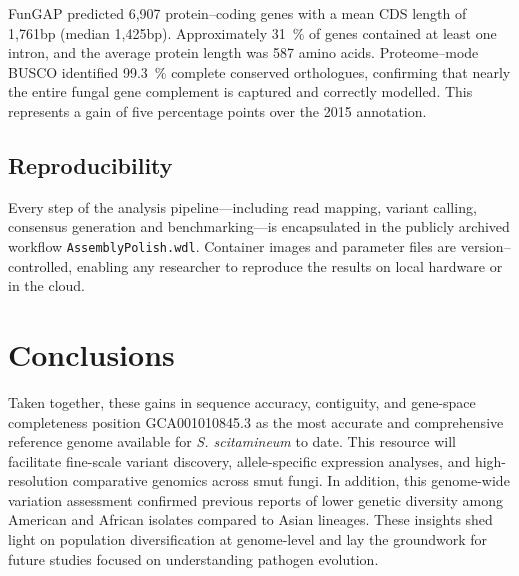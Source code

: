 \documentclass[Journal,letterpaper]{theme}
\begin{document}
FunGAP predicted 6,907 protein--coding genes with a mean CDS length
of 1,761bp (median 1,425bp). Approximately 31~\% of genes contained
at least one intron, and the average protein length was 587 amino
acids. Proteome--mode BUSCO identified 99.3~\% complete conserved
orthologues, confirming that nearly the entire fungal gene complement
is captured and correctly modelled. This represents a gain of five
percentage points over the 2015 annotation.

\subsection*{Reproducibility}

Every step of the analysis pipeline—including read mapping, variant
calling, consensus generation and benchmarking—is encapsulated in the
publicly archived workflow \texttt{AssemblyPolish.wdl}. Container
images and parameter files are version--controlled, enabling any
researcher to reproduce the results on local hardware or in the cloud.

\section*{Conclusions}

Taken together, these gains in sequence accuracy, contiguity, and
gene-space completeness position GCA001010845.3 as the most accurate
and comprehensive reference genome available for \textit{S.
scitamineum} to date. This resource will facilitate fine-scale
variant discovery, allele-specific expression analyses, and
high-resolution comparative genomics across smut fungi.
In addition, this genome-wide variation assessment confirmed
previous reports of lower genetic diversity among American and
African isolates compared to Asian lineages. These insights shed
light on population diversification at genome-level and lay the
groundwork for future studies focused on understanding pathogen evolution.
\end{document}

